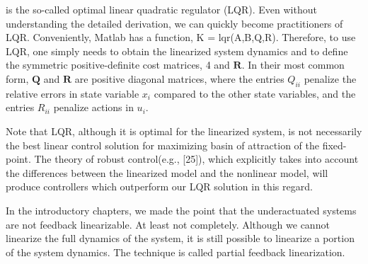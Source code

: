 \documentclass{article}
\begin{document}
is the so-called optimal linear quadratic regulator (LQR). Even without understanding the detailed derivation, we can quickly become practitioners of LQR. Conveniently, Matlab has a function, K = lqr(A,B,Q,R). Therefore, to use LQR, one simply needs to obtain the linearized system dynamics and to define the symmetric positive-definite cost matrices, 4 and ${\bm{R}}$. In their most common form, ${\bm{Q}}$ and ${\bm{R}}$ are positive diagonal matrices, where the entries $Q_{ii}$ penalize the relative errors in state variable $x_i$ compared to the other state variables, and the entries $R_{ii}$ penalize actions in $u_i$.



Note that LQR, although it is optimal for the linearized system, is not necessarily the best linear control solution for maximizing basin of attraction of the fixed-point. The theory of robust control(e.g., [25]), which explicitly takes into account the differences between the linearized model and the nonlinear model, will produce controllers which outperform our LQR solution in this regard.

In the introductory chapters, we made the point that the underactuated systems are not feedback linearizable. At least not completely. Although we cannot linearize the full dynamics of the system, it is still possible to linearize a portion of the system dynamics. The technique is called partial feedback linearization.
\end{document}

